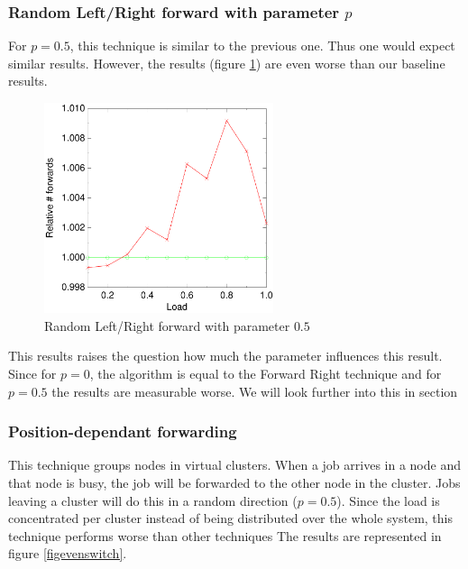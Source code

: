 \documentclass[10pt,a4paper,titlepage]{article}
\begin{document}
\subsubsection{Random Left/Right forward with parameter $p$}
For $p=0.5$, this technique is similar to the previous one. Thus one would expect similar results. However, the results (figure \ref{figrandswitch}) are even worse than our baseline results.

\begin{figure}[h!tb]
\centering
\includegraphics[width=0.6\textwidth]{data/randswitchright.pdf}
\caption{Random Left/Right forward with parameter $0.5$}
\label{figrandswitch}
\end{figure}

This results raises the question how much the parameter influences this result. Since for $p=0$, the algorithm is equal to the Forward Right technique and for $p=0.5$ the results are measurable worse. We will look further into this in section %

\subsubsection{Position-dependant forwarding}
This technique groups nodes in virtual clusters. When a job arrives in a node and that node is busy, the job will be forwarded to the other node in the cluster. Jobs leaving a cluster will do this in a random direction ($p=0.5$). Since the load is concentrated per cluster instead of being distributed over the whole system, this technique performs worse than other techniques The results are represented in figure \ref{figevenswitch}.
\end{document}
